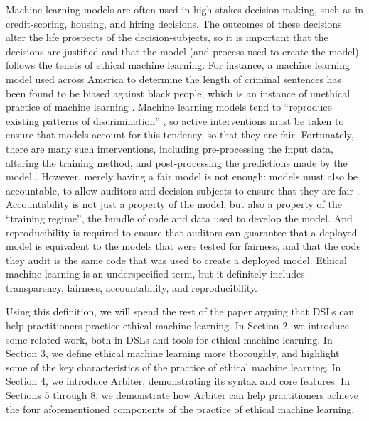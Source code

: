 \documentclass[letterpaper]{article}
\newcommand{\citep}[1]{\cite{#1}}
\begin{document}
Machine learning models are often used in high-stakes decision making, such as in credit-scoring, housing, and hiring decisions. The outcomes of these decisions alter the life prospects of the decision-subjects, so it is important that the decisions are justified and that the model (and process used to create the model) follows the tenets of ethical machine learning. For instance, a machine learning model used across America to determine the length of criminal sentences has been found to be biased against black people, which is an instance of unethical practice of machine learning \citep{Kirchner2016}. Machine learning models tend to ``reproduce existing patterns of discrimination'' \citep{Barocas2016}, so active interventions must be taken to ensure that models account for this tendency, so that they are fair. Fortunately, there are many such interventions, including pre-processing the input data, altering the training method, and post-processing the predictions made by the model \cite{Bellamy2018,Hajian2016}. However, merely having a fair model is not enough: models must also be accountable, to allow auditors and decision-subjects to ensure that they are fair \citep{Binns2018}. Accountability is not just a property of the model, but also a property of the ``training regime'', the bundle of code and data used to develop the model. And reproducibility is required to ensure that auditors can guarantee that a deployed model is equivalent to the models that were tested for fairness, and that the code they audit is the same code that was used to create a deployed model. Ethical machine learning is an underspecified term, but it definitely includes transparency, fairness, accountability, and reproducibility.

Using this definition, we will spend the rest of the paper arguing that DSLs can help practitioners practice ethical machine learning. In Section 2, we introduce some related work, both in DSLs and tools for ethical machine learning. In Section 3, we define ethical machine learning more thoroughly, and highlight some of the key characteristics of the practice of ethical machine learning. In Section 4, we introduce Arbiter, demonstrating its syntax and core features. In Sections 5 through 8, we demonstrate how Arbiter can help practitioners achieve the four aforementioned components of the practice of ethical machine learning. 
\end{document}
